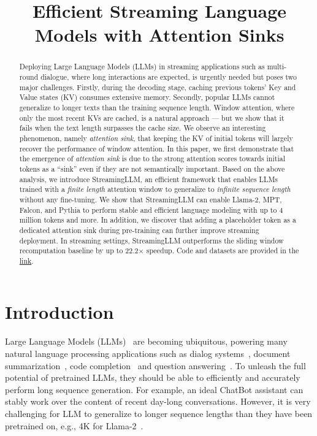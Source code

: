 \title{Efficient Streaming Language Models with Attention Sinks}

\begin{abstract}
Deploying Large Language Models (LLMs) in streaming applications such as multi-round dialogue, where long interactions are expected, is urgently needed but poses two major challenges. Firstly, during the decoding stage, caching previous tokens' Key and Value states (KV) consumes extensive memory. Secondly, popular LLMs cannot generalize to longer texts than the training sequence length. Window attention, where only the most recent KVs are cached, is a natural approach --- but we show that it fails when the text length surpasses the cache size. We observe an interesting phenomenon, namely \emph{attention sink}, that keeping the KV of initial tokens will largely recover the performance of window attention. In this paper, we first demonstrate that the emergence of \emph{attention sink} is due to the strong attention scores towards initial tokens as a ``sink'' even if they are not semantically important. Based on the above analysis, we introduce StreamingLLM, an efficient framework that enables LLMs trained with a \textit{finite length} attention window to generalize to \textit{infinite sequence length} without any fine-tuning. We show that StreamingLLM can enable Llama-2, MPT, Falcon, and Pythia to perform stable and efficient language modeling with up to 4 million tokens and more. In addition, we discover that adding a placeholder token as a dedicated attention sink during pre-training can further improve streaming deployment. In streaming settings, StreamingLLM outperforms the sliding window recomputation baseline by up to 22.2$\times$ speedup. Code and datasets are provided in the \href{https://github.com/mit-han-lab/streaming-llm}{link}.
\end{abstract}

\section{Introduction}
Large Language Models (LLMs)~\citep{radford2018improving,brown2020language,zhang2022opt,openai2023gpt4,touvron2023llama,touvron2023llama2} are becoming ubiquitous, powering many natural language processing applications such as dialog systems~\citep{schulman2022chatgpt,alpaca,vicuna2023}, document summarization~\citep{goyal-durrett-2020-evaluating,zhang2023benchmarking}, code completion~\citep{chen2021evaluating,rozière2023code}  and question answering~\citep{kamalloo2023evaluating}. To unleash the full potential of pretrained LLMs, they should be able to efficiently and accurately perform long sequence generation. For example, an ideal ChatBot assistant can stably work over the content of recent day-long conversations. However, it is very challenging for LLM to generalize to longer sequence lengths than they have been pretrained on, e.g., 4K for Llama-2~\cite{touvron2023llama2}. 

